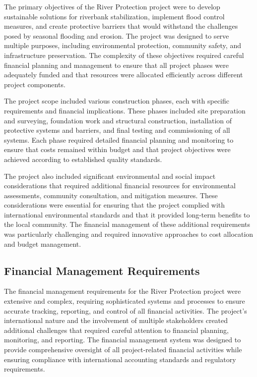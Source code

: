 The primary objectives of the River Protection project were to develop sustainable solutions for riverbank stabilization, implement flood control measures, and create protective barriers that would withstand the challenges posed by seasonal flooding and erosion. The project was designed to serve multiple purposes, including environmental protection, community safety, and infrastructure preservation. The complexity of these objectives required careful financial planning and management to ensure that all project phases were adequately funded and that resources were allocated efficiently across different project components.

The project scope included various construction phases, each with specific requirements and financial implications. These phases included site preparation and surveying, foundation work and structural construction, installation of protective systems and barriers, and final testing and commissioning of all systems. Each phase required detailed financial planning and monitoring to ensure that costs remained within budget and that project objectives were achieved according to established quality standards.

The project also included significant environmental and social impact considerations that required additional financial resources for environmental assessments, community consultation, and mitigation measures. These considerations were essential for ensuring that the project complied with international environmental standards and that it provided long-term benefits to the local community. The financial management of these additional requirements was particularly challenging and required innovative approaches to cost allocation and budget management.

\subsection{Financial Management Requirements}
The financial management requirements for the River Protection project were extensive and complex, requiring sophisticated systems and processes to ensure accurate tracking, reporting, and control of all financial activities. The project's international nature and the involvement of multiple stakeholders created additional challenges that required careful attention to financial planning, monitoring, and reporting. The financial management system was designed to provide comprehensive oversight of all project-related financial activities while ensuring compliance with international accounting standards and regulatory requirements.

